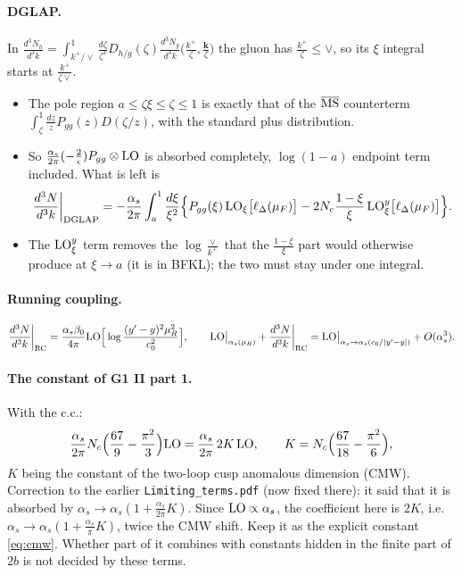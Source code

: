 \documentclass[10pt]{article}
\numberwithin{equation}{section}
\newcommand{\new}[1]{{\color{blue}#1}}
\newcommand{\LO}{{\rm LO}}
\newcommand{\MSb}{\overline{\rm MS}}
\begin{document}
\paragraph{DGLAP.} In $\frac{d^3N_h}{d^3k}=\int_{k^+/\vee}^1\frac{d\zeta}{\zeta^3}D_{h/g}(\zeta)\frac{d^3N_g}{d^3k}\big(\frac{k^+}{\zeta},\frac{\mathbf k}{\zeta}\big)$ the gluon has $\frac{k^+}{\zeta}\le\vee$, so its $\xi$ integral starts at $\frac{k^+}{\zeta\vee}$.
\begin{itemize}
\item The pole region $a\le\zeta\xi\le\zeta\le1$ is exactly that of the $\MSb$ counterterm $\int_\zeta^1\frac{dz}{z}P_{gg}(z)D(\zeta/z)$, with the standard plus distribution.
\item So $\frac{\alpha_s}{2\pi}(-\frac2\epsilon)P_{gg}\otimes\LO$ is absorbed completely, $\log(1-a)$ endpoint term included. What is left is
\begin{equation}
\frac{d^3N}{d^3k}\bigg|_{\rm DGLAP}=-\frac{\alpha_s}{2\pi}\int_a^1\frac{d\xi}{\xi^2}\Big\{P_{gg}(\xi)\,\LO_\xi\big[\ell_\Delta(\mu_F)\big]-2N_c\frac{1-\xi}{\xi}\,\LO^y_\xi\big[\ell_\Delta(\mu_F)\big]\Big\}.\label{eq:dglapfin}
\end{equation}
\item The $\LO^y_\xi$ term removes the $\log\frac{\vee}{k^+}$ that the $\frac{1-\xi}{\xi}$ part would otherwise produce at $\xi\to a$ (it is in BFKL); the two must stay under one integral.
\end{itemize}
\paragraph{Running coupling.}
\begin{equation}
\frac{d^3N}{d^3k}\bigg|_{\rm RC}=\frac{\alpha_s\beta_0}{4\pi}\LO\Big[\log\frac{(y'-y)^2\mu_R^2}{c_0^2}\Big],\qquad \LO\big|_{\alpha_s(\mu_R)}+\frac{d^3N}{d^3k}\bigg|_{\rm RC}=\LO\big|_{\alpha_s\to\alpha_s(c_0/|y'-y|)}+O(\alpha_s^3).\label{eq:rc}
\end{equation}
\paragraph{The constant of G1 II part 1.} With the c.c.:
\begin{equation}
\frac{\alpha_s}{2\pi}N_c\Big(\frac{67}{9}-\frac{\pi^2}{3}\Big)\LO=\frac{\alpha_s}{2\pi}\,2K\,\LO,\qquad K=N_c\Big(\frac{67}{18}-\frac{\pi^2}{6}\Big),\label{eq:cmw}
\end{equation}
$K$ being the constant of the two-loop cusp anomalous dimension (CMW). \new{Correction to the earlier \texttt{Limiting\_terms.pdf} (now fixed there):} it said that it is absorbed by $\alpha_s\to\alpha_s(1+\frac{\alpha_s}{2\pi}K)$. Since $\LO\propto\alpha_s$, the coefficient here is $2K$, i.e.\ $\alpha_s\to\alpha_s(1+\frac{\alpha_s}{\pi}K)$, twice the CMW shift. Keep it as the explicit constant \eqref{eq:cmw}. Whether part of it combines with constants hidden in the finite part of $2b$ is not decided by these terms.
\end{document}
